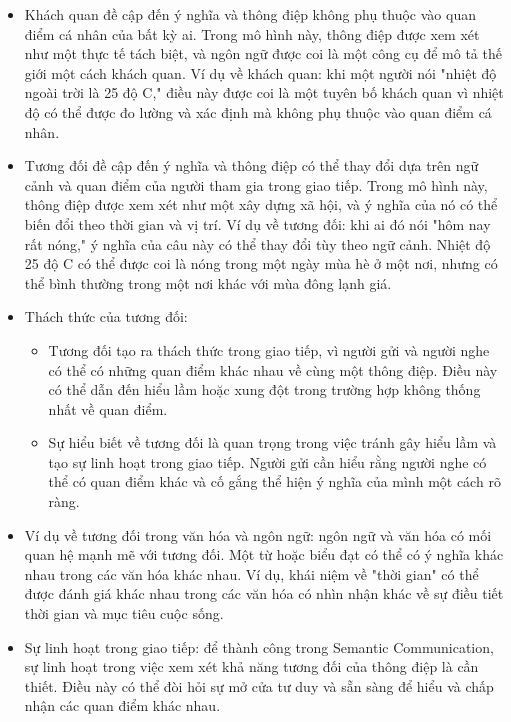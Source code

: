 \documentclass{article} %
\begin{document}
\begin{itemize}
    \item Khách quan đề cập đến ý nghĩa và thông điệp không phụ thuộc vào quan điểm cá nhân của bất kỳ ai. Trong mô hình này, thông điệp được xem xét như một thực tế tách biệt, và ngôn ngữ được coi là một công cụ để mô tả thế giới một cách khách quan. Ví dụ về khách quan: khi một người nói "nhiệt độ ngoài trời là 25 độ C," điều này được coi là một tuyên bố khách quan vì nhiệt độ có thể được đo lường và xác định mà không phụ thuộc vào quan điểm cá nhân.

    \item Tương đối đề cập đến ý nghĩa và thông điệp có thể thay đổi dựa trên ngữ cảnh và quan điểm của người tham gia trong giao tiếp. Trong mô hình này, thông điệp được xem xét như một xây dựng xã hội, và ý nghĩa của nó có thể biến đổi theo thời gian và vị trí. Ví dụ về tương đối: khi ai đó nói "hôm nay rất nóng," ý nghĩa của câu này có thể thay đổi tùy theo ngữ cảnh. Nhiệt độ 25 độ C có thể được coi là nóng trong một ngày mùa hè ở một nơi, nhưng có thể bình thường trong một nơi khác với mùa đông lạnh giá.

\item Thách thức của tương đối:
\begin{itemize}
    \item Tương đối tạo ra thách thức trong giao tiếp, vì người gửi và người nghe có thể có những quan điểm khác nhau về cùng một thông điệp. Điều này có thể dẫn đến hiểu lầm hoặc xung đột trong trường hợp không thống nhất về quan điểm.
\item Sự hiểu biết về tương đối là quan trọng trong việc tránh gây hiểu lầm và tạo sự linh hoạt trong giao tiếp. Người gửi cần hiểu rằng người nghe có thể có quan điểm khác và cố gắng thể hiện ý nghĩa của mình một cách rõ ràng.
\end{itemize}

\item Ví dụ về tương đối trong văn hóa và ngôn ngữ: ngôn ngữ và văn hóa có mối quan hệ mạnh mẽ với tương đối. Một từ hoặc biểu đạt có thể có ý nghĩa khác nhau trong các văn hóa khác nhau. Ví dụ, khái niệm về "thời gian" có thể được đánh giá khác nhau trong các văn hóa có nhìn nhận khác về sự điều tiết thời gian và mục tiêu cuộc sống.

\item Sự linh hoạt trong giao tiếp: để thành công trong Semantic Communication, sự linh hoạt trong việc xem xét khả năng tương đối của thông điệp là cần thiết. Điều này có thể đòi hỏi sự mở cửa tư duy và sẵn sàng để hiểu và chấp nhận các quan điểm khác nhau.
\end{itemize}
\end{document}
